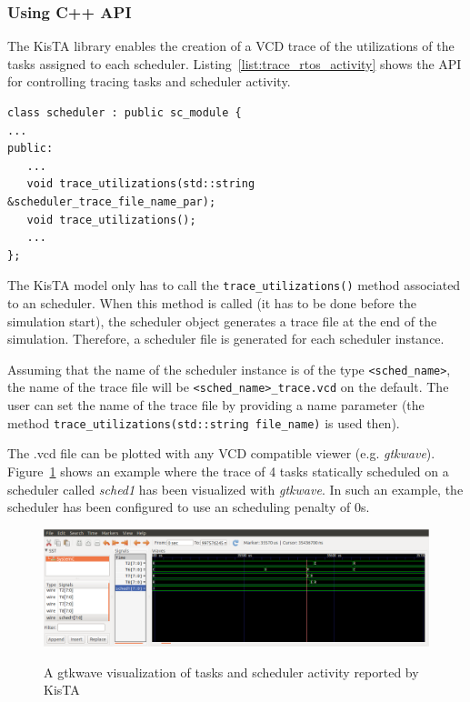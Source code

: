\subsubsection{Using C++ API}
\label{sec:tracing_cpp_api}

The KisTA library enables the creation of a VCD trace of the utilizations of the tasks assigned to each scheduler.
%
Listing~\ref{list:trace_rtos_activity} shows the API for controlling tracing tasks and scheduler activity.

\begin{lstlisting}[style=KistaCodeStyle,caption={API for controling tracing tasks and scheduler activity.},label=list:trace_rtos_activity]
class scheduler : public sc_module {
...
public:
   ...
   void trace_utilizations(std::string &scheduler_trace_file_name_par);
   void trace_utilizations();
   ...
};
\end{lstlisting}

The KisTA model only has to call the \texttt{trace\_utilizations()} method associated to an scheduler.
%
When this method is called (it has to be done before the simulation start), the scheduler object generates a trace file at the end of the simulation.
%
Therefore, a scheduler file is generated for each scheduler instance. 

Assuming that the name of the scheduler instance is of the type \texttt{<sched\_name>},
the name of the trace file will be \texttt{<sched\_name>\_trace.vcd} on the default.
The user can set the name of the trace file by providing a name parameter (the method \texttt{trace\_utilizations(std::string file\_name)} is used then).

The .vcd file can be plotted with any VCD compatible viewer (e.g. \emph{gtkwave}).
Figure~\ref{fig:trace_example} shows an example where the trace of 4 tasks statically scheduled on
a scheduler called \emph{sched1} has been visualized with \emph{gtkwave}.
In such an example, the scheduler has been configured to use an scheduling penalty of 0s.

\begin{figure}[h]
\centering
\includegraphics[width=\textwidth]{./figs/trace_sched1_static_sched.png} 
\label{fig:trace_example}
\caption{A gtkwave visualization of tasks and scheduler activity reported by KisTA} 
\end{figure}

